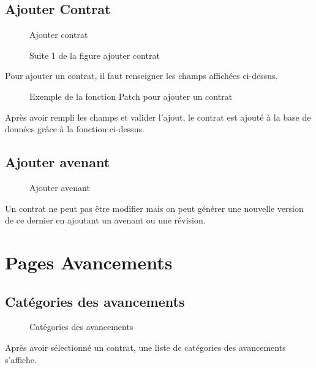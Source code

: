\subsection{Ajouter Contrat}
\begin{figure}[H]
    \begin{center}
        \caption{Ajouter contrat}
    \end{center}
\end{figure}
\begin{figure}[H]
    \begin{center}
        \caption{Suite 1 de la figure ajouter contrat}
    \end{center}
\end{figure}
Pour ajouter un contrat, il faut renseigner les champs affichées ci-dessus.
\begin{figure}[H]
    \begin{center}
        \caption{Exemple de la fonction Patch pour ajouter un contrat}
    \end{center}
\end{figure}
Après avoir rempli les champs et valider l'ajout, le contrat est ajouté à la base de données grâce à la fonction ci-dessus.
\subsection{Ajouter avenant}
\begin{figure}[H]
    \begin{center}
        \caption{Ajouter avenant}
    \end{center}
\end{figure}
Un contrat ne peut pas être modifier mais on peut générer une nouvelle version de ce dernier en ajoutant un avenant ou une révision.
\section{Pages Avancements}
\subsection{Catégories des avancements}
\begin{figure}[H]
    \begin{center}
        \caption{Catégories des avancements}
    \end{center}
\end{figure}
Après avoir sélectionné un contrat, une liste de catégories des avancements s'affiche.
